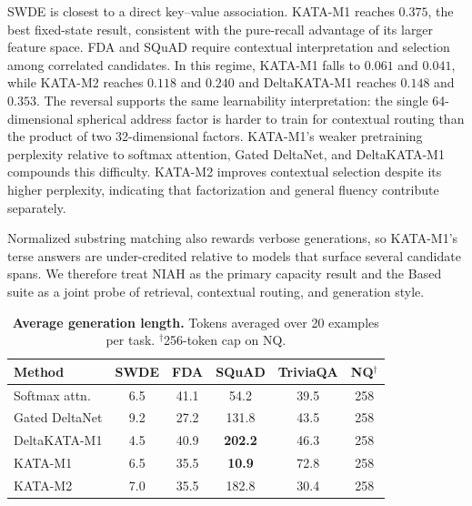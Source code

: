 \documentclass{article}
\newcommand{\1}{\bm{1}}
\theoremstyle{definition}
\begin{document}
SWDE is closest to a direct key--value association. KATA-M1 reaches $0.375$, the best fixed-state
result, consistent with the pure-recall advantage of its larger feature space. FDA and SQuAD require
contextual interpretation and selection among correlated candidates. In this regime, KATA-M1 falls
to $0.061$ and $0.041$, while KATA-M2 reaches $0.118$ and $0.240$ and DeltaKATA-M1 reaches $0.148$
and $0.353$. The reversal supports the same learnability interpretation: the single
64-dimensional spherical address factor is harder to train for contextual routing than the product
of two 32-dimensional factors. KATA-M1's weaker pretraining perplexity relative to softmax attention,
Gated DeltaNet, and DeltaKATA-M1 compounds this difficulty. KATA-M2 improves contextual selection
despite its higher perplexity, indicating that factorization and general fluency contribute
separately.

Normalized substring matching also rewards verbose generations, so KATA-M1's terse answers are
under-credited relative to models that surface several candidate spans. We therefore treat NIAH as
the primary capacity result and the Based suite as a joint probe of retrieval, contextual routing,
and generation style.

\begin{table}[ht]
    \centering\footnotesize
  \begin{tabular}{l|ccccc}
    \toprule
    Method               & SWDE          & FDA  & SQuAD          & TriviaQA & NQ$^{\dagger}$ \\
    \midrule
    Softmax attn.        & 6.5           & 41.1 & 54.2           & 39.5     & 258 \\
    Gated DeltaNet       & 9.2           & 27.2 & 131.8          & 43.5     & 258 \\
    DeltaKATA-M1  & 4.5           & 40.9 & \textbf{202.2} & 46.3     & 258 \\
    KATA-M1   & 6.5           & 35.5 & \textbf{10.9}  & 72.8     & 258 \\
    KATA-M2   & 7.0           & 35.5 & 182.8          & 30.4     & 258 \\
    \bottomrule
  \end{tabular}
    \caption{\textbf{Average generation length.} Tokens averaged over 20 examples per task.
    $^{\dagger}$256-token cap on NQ.}
    \label{tab:qalen}
\end{table}
\end{document}
